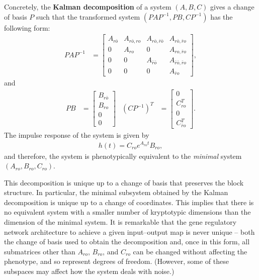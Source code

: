 \documentclass{article}
\newcommand{\ro}{{ro}}
\newcommand{\nro}{{\bar{r}o}}
\newcommand{\rno}{{r\bar{o}}}
\newcommand{\nrno}{{\bar{r}\bar{o}}}
\newcommand{\1}{\mathbbm{1}}
\begin{document}
Concretely, the \textbf{Kalman decomposition} of a system $(A,B,C)$  
gives a change of basis $P$ such that
the transformed system $(PAP^{-1},PB,CP^{-1})$  has the following form:
\begin{align*}
       PAP^{-1}
       &=
       \left[ \begin{array}{cccc}
           A_{\rno} & A_{\rno,\ro} & A_{\rno,\nrno} & A_{\rno,\nro} \\
           0 & A_{\ro} & 0 & A_{\ro,\nro} \\
           0 & 0 & A_{\nrno} & A_{\nrno,\nro} \\
          0 & 0 & 0 & A_{\nro}
       \end{array} \right] ,
\end{align*}
and
\begin{align*}
     PB
     &=
    \left[ \begin{array}{cccc}
         B_{\rno} \\
         B_{\ro} \\
         0 \\
         0 
   \end{array} \right] 
   &
   (CP^{-1})^T
   &=
   \left[ \begin{array}{cccc}
       0 \\
       C_{\ro}^T \\
       0 \\
       C_{\nro}^T
   \end{array} \right] .
\end{align*}
The impulse response of the system is given by
\begin{align*}
      h(t) = C_{\ro} e^{A_{\ro} t} B_{\ro},
\end{align*}
and therefore, the system is phenotypically equivalent to the \emph{minimal} system $(A_{\ro}, B_{\ro}, C_{\ro})$.

This decomposition is unique up to a change of basis that preserves the block structure.
In particular, 
the minimal subsystem obtained by the Kalman decomposition
is unique up to a change of coordinates.
This implies that there is no equivalent system with a smaller number of kryptotypic dimensions
than the dimension of the minimal system.
It is remarkable that the gene regulatory network architecture to achieve a given input--output map is never unique --
both the change of basis used to obtain the decomposition
and, once in this form, all submatrices other than $A_{\ro}$, $B_{\ro}$, and $C_{\ro}$ can be changed without affecting the phenotype,
and so represent degrees of freedom.
(However, some of these subspaces may affect how the system deals with noise.)
\end{document}
